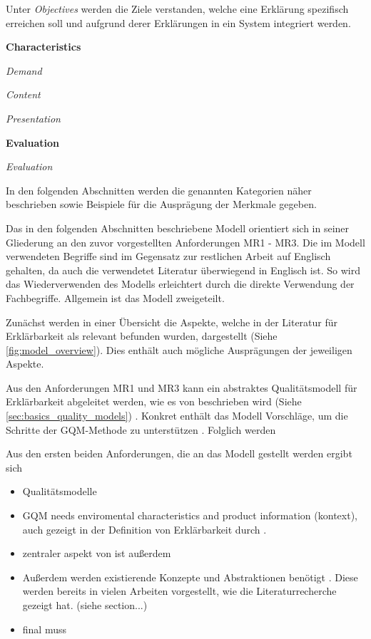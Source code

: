 Unter \textit{Objectives} werden die Ziele verstanden, welche eine Erklärung spezifisch erreichen soll und aufgrund derer Erklärungen in ein System integriert werden.

\textbf{Characteristics}

\textit{Demand}

\textit{Content}

\textit{Presentation}

\textbf{Evaluation}

\textit{Evaluation}

\smallbreak

In den folgenden Abschnitten werden die genannten Kategorien näher beschrieben sowie Beispiele für die Ausprägung der Merkmale gegeben.

Das in den folgenden Abschnitten beschriebene Modell orientiert sich in seiner Gliederung an den zuvor vorgestellten Anforderungen MR1 - MR3. Die im Modell verwendeten Begriffe sind im Gegensatz zur restlichen Arbeit auf Englisch gehalten, da auch die verwendetet Literatur überwiegend in Englisch ist. So wird das Wiederverwenden des Modells erleichtert durch die direkte Verwendung der Fachbegriffe. Allgemein ist das Modell zweigeteilt.

Zunächst werden in einer Übersicht die Aspekte, welche in der Literatur für Erklärbarkeit als relevant befunden wurden, dargestellt (Siehe \autoref{fig:model_overview}). Dies enthält auch mögliche Ausprägungen der jeweiligen Aspekte.

Aus den Anforderungen MR1 und MR3 kann ein abstraktes Qualitätsmodell für Erklärbarkeit abgeleitet werden, wie es von \citeauthor{schneider2012abenteuer} beschrieben wird (Siehe \autoref{sec:basics_quality_models}) \cite{schneider2012abenteuer}. Konkret enthält das Modell Vorschläge, um die Schritte der GQM-Methode zu unterstützen \cite{briand1995goal, schneider2012abenteuer}. Folglich werden 

Aus den ersten beiden Anforderungen, die an das Modell gestellt werden ergibt sich 

\begin{itemize}
    \item Qualitätsmodelle \cite{schneider2012abenteuer}
    \item GQM \cite{briand1995goal, schneider2012abenteuer} needs enviromental characteristics and product information (kontext), auch gezeigt in der Definition von Erklärbarkeit durch \cite{chazette_knowledge_nodate}.
    \item zentraler aspekt von \cite{briand1995goal} ist außerdem 
    \item Außerdem werden existierende Konzepte und Abstraktionen benötigt \cite{briand1995goal}. Diese werden bereits in vielen Arbeiten vorgestellt, wie die Literaturrecherche gezeigt hat. (siehe section...)
    \item final muss 
\end{itemize}

